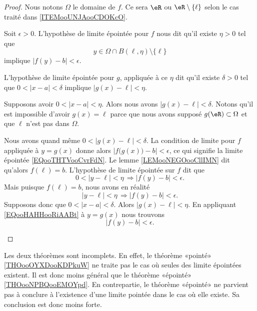 \begin{proof}
	Nous notons \( \Omega\) le domaine de \( f\). Ce sera \( \eR\) ou \( \eR\setminus\{ \ell \}\) selon le cas traité dans \ref{ITEMooUNJAooCDOKcO}.

	Soit \( \epsilon>0\). L'hypothèse de limite épointée pour \( f\) nous dit qu'il existe \( \eta>0\) tel que
	\begin{equation}
		y\in\Omega\cap B(\ell,\eta)\setminus\{ \ell \}
	\end{equation}
	implique \( | f(y)-b |<\epsilon\).

	L'hypothèse de limite épointée pour \( g\), appliquée à ce \( \eta\) dit qu'il existe \( \delta>0\) tel que \( 0<| x-a |<\delta\) implique \( | g(x)-\ell |<\eta\).

	\begin{subproof}
		Supposons avoir \( 0<| x-a |<\eta\). Alors nous avons \( | g(x)-\ell |<\delta\). Notons qu'il est impossible d'avoir \( g(x)=\ell\) parce que nous avons supposé \( g(\eR)\subset \Omega\) et que \( \ell\) n'est pas dans \( \Omega\).

		Nous avons quand même \( 0<| g(x)-\ell |<\delta\). La condition de limite pour \( f\) appliquée à \( y=g(x)\) donne alors \( | f\big( g(x) \big)-b |<\epsilon\), ce qui signifie la limite épointée \eqref{EQooTHTVooCvrFdN}.
		Le lemme \ref{LEMooNEGOooCllIMN} dit qu'alors \( f(\ell)=b\). L'hypothèse de limite épointée sur \( f\) dit que
		\begin{equation}
			0<| y-\ell |<\eta\,\Rightarrow | f(y)-b |<\epsilon.
		\end{equation}
		Mais puisque \( f(\ell)=b\), nous avons en réalité
		\begin{equation}        \label{EQooHAHHooRiAABt}
			| y-\ell |<\eta\,\Rightarrow | f(y)-b |<\epsilon.
		\end{equation}
		Supposons donc que \( 0<|x-a  |<\delta\). Alors \( | g(x)-\ell |<\eta\). En appliquant \eqref{EQooHAHHooRiAABt} à \( y=g(x)\) nous trouvons
		\begin{equation}
			| f(y)-b |<\epsilon.
		\end{equation}
	\end{subproof}
\end{proof}

\begin{normaltext}      \label{NORMooSLAJooLfDreV}
	Les deux théorèmes sont incomplets. En effet, le théorème «pointé» \ref{THOooOYXDooKDPkuW} ne traite pas le cas où seules des limite épointées existent. Il est donc moins général que le théorème «épointé» \ref{THOooNPBQooEMOYpd}. En contrepartie, le théorème «épointé» ne parvient pas à conclure à l'existence d'une limite pointée dans le cas où elle existe. Sa conclusion est donc moins forte.
\end{normaltext}

